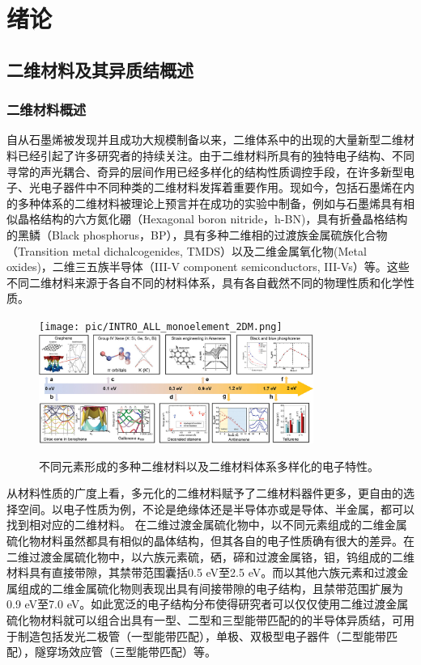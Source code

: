 \chapter{绪\hspace{6pt}论}

\section{二维材料及其异质结概述}
\subsection{二维材料概述}
    自从石墨烯被发现并且成功大规模制备以来，二维体系中的出现的大量新型二维材料已经引起了许多研究者的持续关注。由于二维材料所具有的独特电子结构、不同寻常的声光耦合、奇异的层间作用已经多样化的结构性质调控手段，在许多新型电子、光电子器件中不同种类的二维材料发挥着重要作用。现如今，包括石墨烯在内的多种体系的二维材料被理论上预言并在成功的实验中制备，例如与石墨烯具有相似晶格结构的六方氮化硼（Hexagonal boron nitride，h-BN)，具有折叠晶格结构的黑鳞（Black phosphorus，BP），具有多种二维相的过渡族金属硫族化合物（Transition metal dichalcogenides, TMDS）以及二维金属氧化物(Metal oxides)，二维三五族半导体（III-V component semiconductors, III-Vs）等。这些不同二维材料来源于各自不同的材料体系，具有各自截然不同的物理性质和化学性质。%

    \begin{figure}[htb]
        \texttt{[image: pic/INTRO\_ALL\_monoelement\_2DM.png]}
        \includegraphics[width=0.8\textwidth]{pic/INTRO_electronProperties_All2DM.jpg}
        \caption{不同元素形成的多种二维材料以及二维材料体系多样化的电子特性。}
    \end{figure}

    从材料性质的广度上看，多元化的二维材料赋予了二维材料器件更多，更自由的选择空间。以电子性质为例，不论是绝缘体还是半导体亦或是导体、半金属，都可以找到相对应的二维材料。
    在二维过渡金属硫化物中，以不同元素组成的二维金属硫化物材料虽然都具有相似的晶体结构，但其各自的电子性质确有很大的差异。在二维过渡金属硫化物中，以六族元素硫，硒，碲和过渡金属铬，钼，钨组成的二维材料具有直接带隙，其禁带范围囊括0.5 eV至2.5 eV。而以其他六族元素和过渡金属组成的二维金属硫化物则表现出具有间接带隙的电子结构，且禁带范围扩展为0.9 eV至7.0 eV。如此宽泛的电子结构分布使得研究者可以仅仅使用二维过渡金属硫化物材料就可以组合出具有一型、二型和三型能带匹配的的半导体异质结，可用于制造包括发光二极管（一型能带匹配），单极、双极型电子器件（二型能带匹配），隧穿场效应管（三型能带匹配）等。

